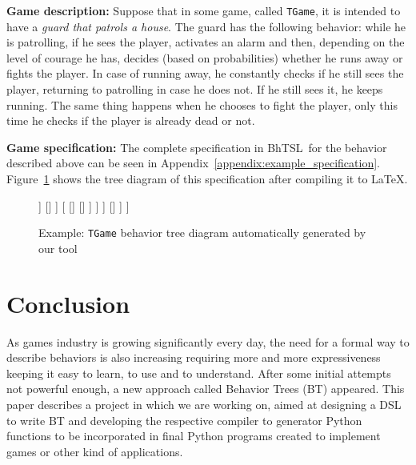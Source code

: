 \documentclass[a4paper,UKenglish,cleveref, autoref, thm-restate]{oasics-v2019}
\def\bht{BhTSL}
\begin{document}
\textbf{Game description:} Suppose that in some game, called \texttt{TGame}, 
it is intended  to have a \emph{guard that patrols a house}.
The guard has the following behavior: while he is patrolling, if he sees the player, activates an alarm and then, 
depending on the level of courage he has, decides (based on probabilities) whether he runs away or fights the player.
In case of running away, he constantly checks if he still sees the player, returning to patrolling in case he does not. 
If he still sees it, he keeps running.
The same thing happens when he chooses to fight the player, only this time he checks if the player is already dead 
or not.

\textbf{Game specification:}
The complete specification in \bht\ for the behavior described above can be seen in 
Appendix~\ref{appendix:example_specification}.
Figure~\ref{fig:example} shows the tree diagram of this specification after compiling it to \LaTeX.
\begin{figure}[h]
    \centering
    \begin{behavior}
        [\rootnode
            [\selector
                [\memorysequence
                    [\condition{sees player}]
                    [\action{activate alarm}]
                    [\memoryprobselector
                        [\probnodesequence{$e1$}
                            [\inverter
                                [\condition{player dead}]
                            ]
                            []
                        ]
                        [
                            []
                            []
                        ]
                    ]
                ]
                []
            ]
        ]
    \end{behavior}
    \caption{Example: \texttt{TGame} behavior tree diagram automatically generated by our tool }
    \label{fig:example}
\end{figure}

\section{Conclusion}
\label{sec:conclusion}

As games industry is growing significantly every day, the need for a formal way to describe behaviors  
is also increasing requiring more and more expressiveness keeping it easy to learn, to use and to understand.
After some initial attempts not powerful enough, a new approach called Behavior Trees (BT) appeared.
This paper describes a project in which we are working on, aimed at designing a DSL to write BT
and developing the respective compiler to generator Python functions to be incorporated in final Python
programs created to implement games or other kind of applications.
\end{document}

